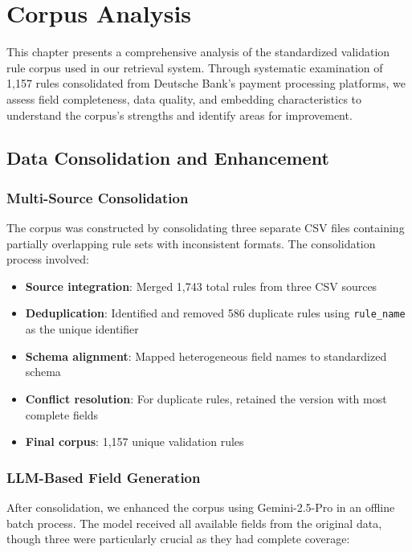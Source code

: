 \chapter{Corpus Analysis}
\label{ch:corpus-analysis}

This chapter presents a comprehensive analysis of the standardized validation rule corpus used in our retrieval system. Through systematic examination of 1,157 rules consolidated from Deutsche Bank's payment processing platforms, we assess field completeness, data quality, and embedding characteristics to understand the corpus's strengths and identify areas for improvement.

\section{Data Consolidation and Enhancement}

\subsection{Multi-Source Consolidation}

The corpus was constructed by consolidating three separate CSV files containing partially overlapping rule sets with inconsistent formats. The consolidation process involved:

\begin{itemize}[leftmargin=*,itemsep=2pt,topsep=2pt]
 \item \textbf{Source integration}: Merged 1,743 total rules from three CSV sources
 \item \textbf{Deduplication}: Identified and removed 586 duplicate rules using \texttt{rule\_name} as the unique identifier
 \item \textbf{Schema alignment}: Mapped heterogeneous field names to standardized schema
 \item \textbf{Conflict resolution}: For duplicate rules, retained the version with most complete fields
 \item \textbf{Final corpus}: 1,157 unique validation rules
\end{itemize}

\subsection{LLM-Based Field Generation}

After consolidation, we enhanced the corpus using Gemini-2.5-Pro in an offline batch process. The model received all available fields from the original data, though three were particularly crucial as they had complete coverage:

